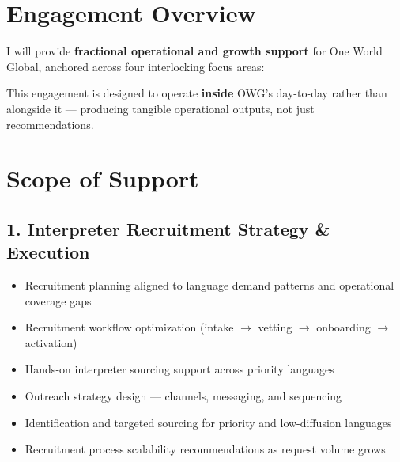 \documentclass{proposal}
\begin{document}
\section{Engagement Overview}

I will provide \textbf{fractional operational and growth support} for One
World Global, anchored across four interlocking focus areas:

\vspace{4pt}
\vspace{4pt}

This engagement is designed to operate \textbf{inside} OWG's day-to-day
rather than alongside it --- producing tangible operational outputs, not just
recommendations.

\section{Scope of Support}

\subsection{1. Interpreter Recruitment Strategy \& Execution}

\begin{itemize}[leftmargin=1.5em, itemsep=3pt, topsep=2pt]
  \item Recruitment planning aligned to language demand patterns and
        operational coverage gaps
  \item Recruitment workflow optimization (intake $\rightarrow$ vetting
        $\rightarrow$ onboarding $\rightarrow$ activation)
  \item Hands-on interpreter sourcing support across priority languages
  \item Outreach strategy design --- channels, messaging, and sequencing
  \item Identification and targeted sourcing for priority and
        low-diffusion languages
  \item Recruitment process scalability recommendations as request volume
        grows
\end{itemize}
\end{document}
